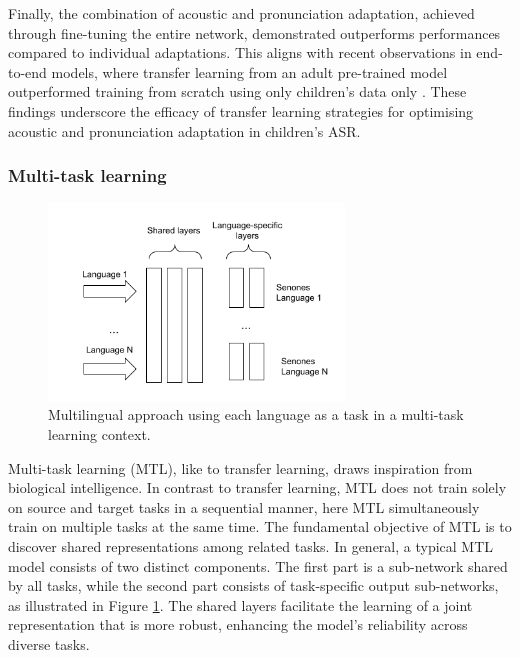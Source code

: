 Finally, the combination of acoustic and pronunciation adaptation, achieved through fine-tuning the entire network, demonstrated outperforms performances compared to individual adaptations. This aligns with recent observations in end-to-end models, where transfer learning from an adult pre-trained model outperformed training from scratch using only children's data only \cite{sri_end2end, gelin2021endtoend}. These findings underscore the efficacy of transfer learning strategies for optimising acoustic and pronunciation adaptation in children's ASR.

\subsubsection{Multi-task learning}%
\label{section:MTL}
\begin{figure}[t]
\begin{center}
\includegraphics[width=0.7\textwidth]{imgs/MTL.png}
\caption{Multilingual approach using each language as a task in a multi-task learning context.}
\label{fig:MTL}
\end{center}
\end{figure}

Multi-task learning (MTL), like to transfer learning, draws inspiration from biological intelligence. In contrast to transfer learning, MTL does not train solely on source and target tasks in a sequential manner, here MTL simultaneously train on multiple tasks at the same time. The fundamental objective of MTL is to discover shared representations among related tasks.  In general, a typical MTL model consists of two distinct components. The first part is a sub-network shared by all tasks, while the second part consists of task-specific output sub-networks, as illustrated in Figure \ref{fig:MTL}. The shared layers facilitate the learning of a joint representation that is more robust, enhancing the model's reliability across diverse tasks.


